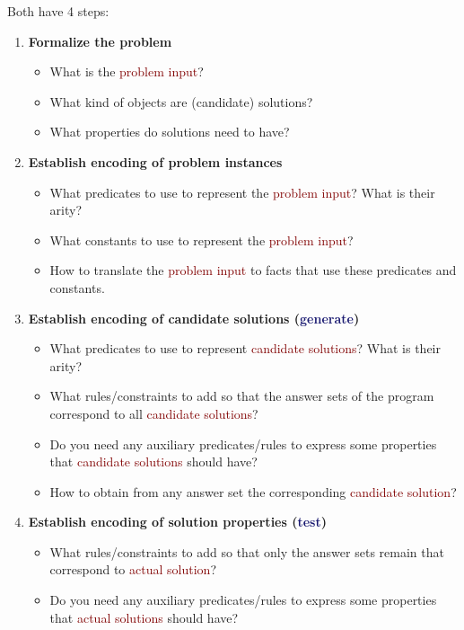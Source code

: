 Both have 4 steps:
\begin{enumerate}
    \setlength\itemsep{-0.25em}
    \item \textbf{Formalize the problem}
    \begin{itemize}
        \setlength\itemsep{-0.25em}
        \item What is the \textcolor{Maroon}{problem input}?
        \item What kind of objects are (candidate) solutions?
        \item What properties do solutions need to have?
    \end{itemize}
    \item \textbf{Establish encoding of problem instances}
    \begin{itemize}
        \setlength\itemsep{-0.25em}
        \item What predicates to use to represent the \textcolor{Maroon}{problem input}? What is their arity?
        \item What constants to use to represent the \textcolor{Maroon}{problem input}?
        \item How to translate the \textcolor{Maroon}{problem input} to facts that use these predicates and constants.
    \end{itemize}
    \item \textbf{Establish encoding of candidate solutions (\textcolor{MidnightBlue}{generate})}
    \begin{itemize}
        \setlength\itemsep{-0.25em}
        \item What predicates to use to represent \textcolor{Maroon}{candidate solutions}? What is their arity?
        \item What rules/constraints to add so that the answer sets of the program correspond to all \textcolor{Maroon}{candidate solutions}?
        \item Do you need any auxiliary predicates/rules to express some properties that \textcolor{Maroon}{candidate solutions} should have?
        \item How to obtain from any answer set the corresponding \textcolor{Maroon}{candidate solution}?
    \end{itemize}
    \item \textbf{Establish encoding of solution properties (\textcolor{MidnightBlue}{test})}
    \begin{itemize}
        \setlength\itemsep{-0.25em}
        \item What rules/constraints to add so that only the answer sets remain that correspond to \textcolor{Maroon}{actual solution}?
        \item Do you need any auxiliary predicates/rules to express some properties that \textcolor{Maroon}{actual solutions} should have?
    \end{itemize}
\end{enumerate}

